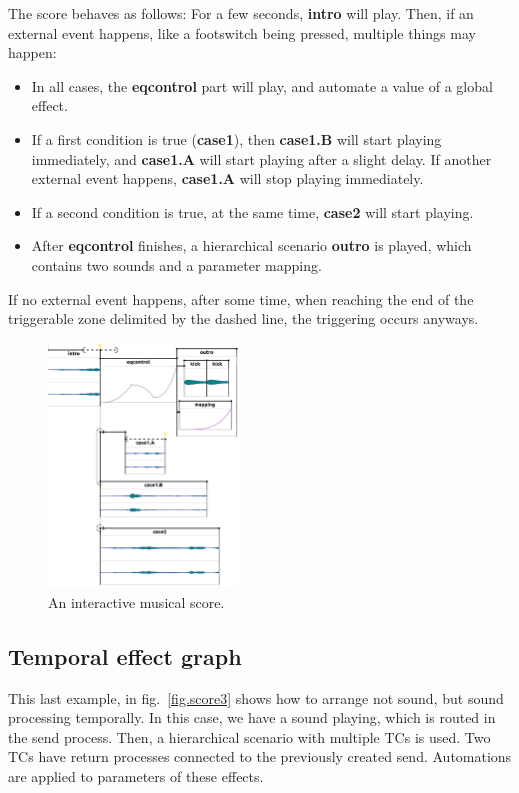 \documentclass{article}
\newcommand*{\timeconstraints}{\acp{TC}\xspace}
\begin{document}
The score behaves as follows: 
For a few seconds, \textbf{intro} will play.  
Then, if an external event happens, like a footswitch being pressed, 
multiple things may happen: 
\begin{itemize}
    \item In all cases, the \textbf{eqcontrol} part will play, and automate a value of a global effect.
    \item If a first condition is true (\textbf{case1}), then \textbf{case1.B} will start playing immediately, and \textbf{case1.A} will start playing after a slight delay. If another external event happens, \textbf{case1.A} will stop playing immediately.
    \item If a second condition is true, at the same time, \textbf{case2} will start playing.
    \item After \textbf{eqcontrol} finishes, a hierarchical scenario \textbf{outro} is played, which contains two sounds and a parameter mapping.
\end{itemize}
If no external event happens, after some time, when reaching the end of the triggerable zone delimited by the dashed line, the triggering occurs anyways.

\begin{figure}[h]
    \centering
    \includegraphics[width=0.45\textwidth]{figures/ex2.png}
    \caption{An interactive musical score.}
    \label{fig.score2}
\end{figure}
\newpage
\subsection{Temporal effect graph}
This last example, in fig.~\ref{fig.score3} shows how to arrange not sound, but sound processing temporally.
In this case, we have a sound playing, which is routed in the send process.
Then, a hierarchical scenario with multiple \timeconstraints is used. Two \timeconstraints have return processes connected to the previously created send.
Automations are applied to parameters of these effects.
\end{document}
